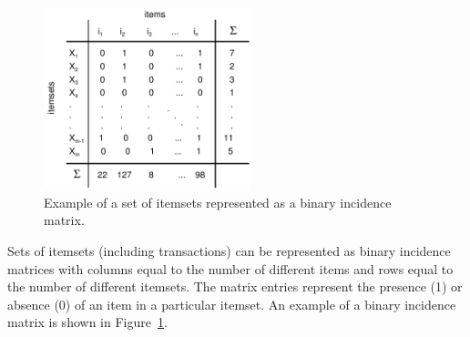 \documentclass[10pt,a4paper]{article}
\begin{document}
\begin{figure}[tp]
\centering
\includegraphics[width=6cm]{itemsetMatrix}
\caption{Example of a set of itemsets represented as a 
    binary incidence matrix.\label{fig:itemsetMatrix}}
\end{figure}

Sets of itemsets (including transactions) 
can be represented as binary incidence matrices
with columns equal to the number of different
items and rows equal to the number of different itemsets. 
The matrix entries represent the presence (1) or absence (0) of an item in a
particular itemset.
An example of a binary incidence matrix is shown in 
Figure~\ref{fig:itemsetMatrix}.
\end{document}
